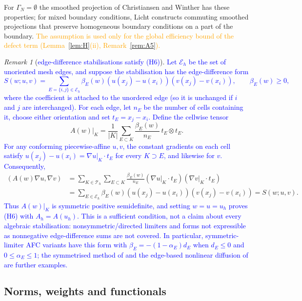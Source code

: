 \documentclass[11pt]{article}
\newcommand{\rev}[1]{\textcolor{blue}{#1}}
\newcommand{\refe}[1]{\textcolor{orange}{#1}}   %
\theoremstyle{plain}
\theoremstyle{remark}
\newtheorem{remark}[theorem]{Remark}
\numberwithin{equation}{section}
\begin{document}
For $\Gamma_N=\emptyset$ the smoothed projection of Christiansen and Winther \cite{CW08} has these
properties; for mixed boundary conditions, Licht \cite{Licht19} constructs commuting smoothed
projections that preserve homogeneous boundary conditions on a part of the boundary. \refe{The assumption
is used only for the global efficiency bound of the defect term (Lemma~\ref{lem:H}(ii), Remark~\ref{rem:A5}).}

\begin{remark}[\rev{edge-difference stabilisations satisfy (H6)}]\label{rem:H6}
\rev{Let $\mathcal E_h$ be the set of unoriented mesh edges, and suppose the stabilisation has the
edge-difference form
\[
  S(w;u,v)=\sum_{E=\{i,j\}\in\mathcal E_h}\beta_E(w)
  (u(x_j)-u(x_i))(v(x_j)-v(x_i)),\qquad \beta_E(w)\ge0,
\]
where the coefficient is attached to the unordered edge (so it is unchanged if $i$ and $j$ are
interchanged). For each edge, let $n_E$ be the number of cells containing it, choose either
orientation and set $t_E=x_j-x_i$. Define the cellwise tensor}
{\color{blue}\[
  A(w)|_K=\frac1{|K|}\sum_{E\subset K}\frac{\beta_E(w)}{n_E}\,t_E\otimes t_E.
\]}
\rev{For any conforming piecewise-affine $u,v$, the constant gradients on each cell satisfy
$u(x_j)-u(x_i)=\nabla u|_K\cdot t_E$ for every $K\supset E$, and likewise for $v$. Consequently,}
{\color{blue}\begin{align*}
  (A(w)\nabla u,\nabla v)
  &=\sum_{K\in\mathcal T_h}\sum_{E\subset K}
    \frac{\beta_E(w)}{n_E}
    (\nabla u|_K\cdot t_E)(\nabla v|_K\cdot t_E)\\
  &=\sum_{E\in\mathcal E_h}\beta_E(w)
    (u(x_j)-u(x_i))(v(x_j)-v(x_i))=S(w;u,v).
\end{align*}}
\rev{Thus $A(w)|_K$ is symmetric positive semidefinite, and setting $w=u=u_h$ proves (H6) with
$A_h=A(u_h)$. This is a sufficient condition, not a claim about every algebraic stabilisation:
nonsymmetric/directed limiters and forms not expressible as nonnegative edge-difference sums are not
covered. In particular, symmetric-limiter AFC variants have this form with
$\beta_E=-(1-\alpha_E)d_E$ when $d_E\le0$ and $0\le\alpha_E\le1$; the symmetrised method of
\cite{Kn23} and the edge-based nonlinear diffusion of \cite{BBK17} are further examples.}
\end{remark}

\subsection{Norms, weights and functionals}
\end{document}
